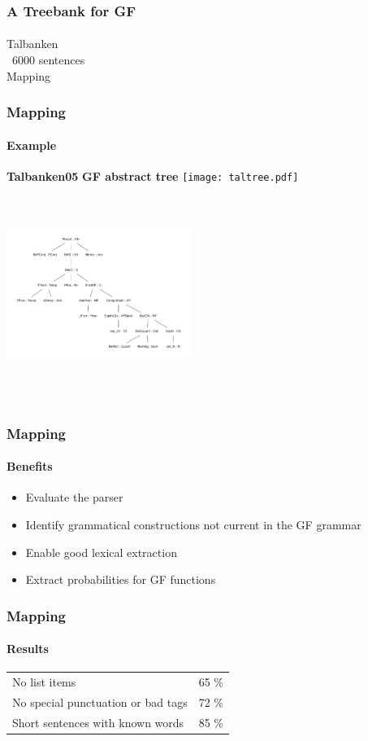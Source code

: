 \documentclass[10pt]{beamer}
\begin{document}
\begin{frame}
\frametitle{A Treebank for GF}
\framesubtitle{} 
Talbanken\\
~6000 sentences\\
  \pause
Mapping \\
\end{frame}


\begin{frame}
\frametitle{Mapping}
\framesubtitle{Example} 
\small{\textbf{Talbanken05}}\hspace{160pt}
\small{\textbf{GF abstract tree}}
\texttt{[image: taltree.pdf]}
\includegraphics[width=170pt,height=200pt]{gftree.pdf}
\end{frame}


\begin{frame}
\frametitle{Mapping}
\framesubtitle{Benefits} 
\begin{itemize}
\item{Evaluate the parser}
\pause
\item{Identify grammatical constructions not current in the GF grammar}
\pause
\item{Enable good lexical extraction}
\pause
\item{Extract probabilities for GF functions}
\end{itemize}
\end{frame}

\begin{frame}
\frametitle{Mapping}
\framesubtitle{Results} 
\begin{tabular}{|ll|}
No list items & 65 \%\\
No special punctuation or bad tags& 72 \%\\
Short sentences with known words & 85 \%\\
\end{tabular}
\end{frame}
\end{document}
